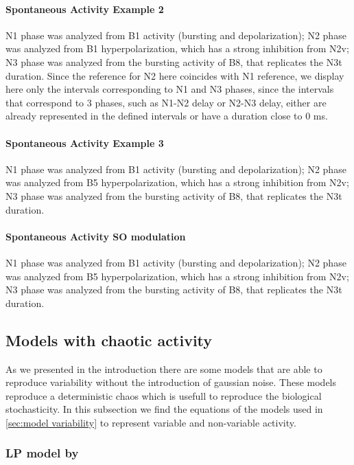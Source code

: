 \paragraph{Spontaneous Activity Example 2}
N1 phase was analyzed from B1 activity (bursting and depolarization); N2 phase was analyzed from B1 hyperpolarization, which has a strong inhibition from N2v; N3 phase was analyzed from the bursting activity of B8, that replicates the N3t duration. 
Since the reference for N2 here coincides with N1 reference, we display here only the intervals corresponding to N1 and N3 phases, since the intervals that correspond to 3 phases, such as N1-N2 delay or N2-N3 delay, either are already represented in the defined intervals or have a duration close to 0 ms.

\paragraph{Spontaneous Activity Example 3}
N1 phase was analyzed from B1 activity (bursting and depolarization); N2 phase was analyzed from B5 hyperpolarization, which has a strong inhibition from N2v; N3 phase was analyzed from the bursting activity of B8, that replicates the N3t duration. 

\paragraph{Spontaneous Activity SO modulation}
N1 phase was analyzed from B1 activity (bursting and depolarization); N2 phase was analyzed from B5 hyperpolarization, which has a strong inhibition from N2v; N3 phase was analyzed from the bursting activity of B8, that replicates the N3t duration. 

\subsection{Models with chaotic activity}
\label{sec:model variability equations}
As we presented in the introduction there are some models that are able to reproduce variability without the introduction of gaussian noise. These models reproduce a deterministic chaos which is usefull to reproduce the biological stochasticity. In this subsection we find the equations of the models used in \ref{sec:model variability} to represent variable and non-variable activity.
\subsubsection{LP model by \cite{nowotny_probing_2008}}

